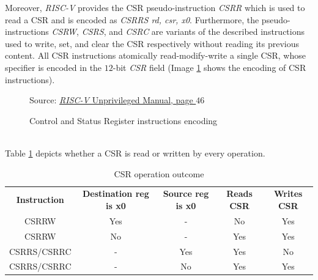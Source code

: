 Moreover, \textit{RISC-V} provides the CSR pseudo-instruction \textit{CSRR} which
is used to read a CSR and is encoded as \textit{CSRRS rd, csr, x0}. Furthermore,
the pseudo-instructions \textit{CSRW}, \textit{CSRS}, and \textit{CSRC} are variants
of the described instructions used to write, set, and clear the CSR respectively
without reading its previous content. All CSR instructions atomically read-modify-write
a single CSR, whose specifier is encoded in the $12$-bit \textit{CSR} field (Image
\ref{fig:csrinstr} shows the encoding of CSR instructions). \\
\begin{figure}[htbp]
  \centering
  \def\stackalignment{r} %
  {\scriptsize Source: \href{https://drive.google.com/file/d/1uviu1nH-tScFfgrovvFCrj7Omv8tFtkp/view}{\textit{RISC-V} Unprivileged Manual, page $46$}}
  \caption{Control and Status Register instructions encoding}
  \label{fig:csrinstr}
\end{figure}
\\

Table \ref{tab:csrop} depicts whether a CSR is read or written by every
operation.

\begin{table}
  \centering
  \begin{tabular}{|c|c|c|c|c|}
    \hline
    \textbf{Instruction} & \textbf{Destination reg is x0} & \textbf{Source reg is x0} & \textbf{Reads CSR} & \textbf{Writes CSR} \\
    \hhline{=====} CSRRW & Yes                            & -                         & No                 & Yes                 \\
    \hline
    CSRRW                & No                             & -                         & Yes                & Yes                 \\
    \hline
    CSRRS/CSRRC          & -                              & Yes                       & Yes                & No                  \\
    \hline
    CSRRS/CSRRC          & -                              & No                        & Yes                & Yes                 \\
    \hline
  \end{tabular}
  \caption{CSR operation outcome}
  \label{tab:csrop}
\end{table}

